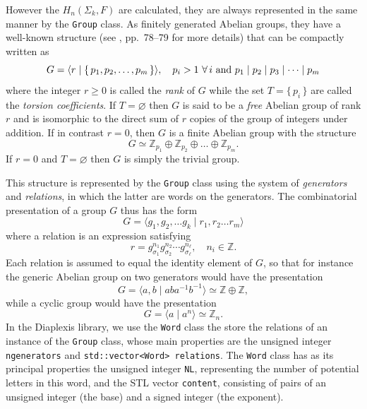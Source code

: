 \documentclass[12pt,letterpaper]{report}
\begin{document}
However the $H_n(\Sigma_k,F)$ are calculated, they are always represented in the same manner by  
the \texttt{Group} class. As finitely generated Abelian groups, they have a well-known structure (see 
\cite{Hungerford}, pp.\ 78--79 for more details) that can be compactly written as 
\begin{equation}
G = \langle r \mid \{\, p_1,p_2,\dots,p_m \,\} \rangle, \quad p_i > 1 \,\, \forall \, i \textnormal{ and } 
p_1\mid p_2 \mid p_3 \mid \dotsb \mid p_m
\end{equation}
where the integer $r \ge 0$ is called the \emph{rank} of $G$ while the set $T = \{\, p_i \,\}$ are called the 
\emph{torsion coefficients}. If $T=\varnothing$ then $G$ is said to be a \emph{free} Abelian group 
of rank $r$ and is isomorphic to the direct sum of $r$ copies of the group of integers under addition. 
If in contrast $r=0$, then $G$ is a finite Abelian group with the structure 
\begin{equation*}
G \simeq \mathbb{Z}_{p_1} \oplus \mathbb{Z}_{p_2} \oplus \dots \oplus \mathbb{Z}_{p_m}. 
\end{equation*}
If $r = 0$ and $T = \varnothing$ then $G$ is simply the trivial group. 

This structure is represented by the \texttt{Group} class using the system of \emph{generators} and 
\emph{relations}, in which the latter are words on the generators. The combinatorial presentation 
of a group $G$ thus has the form
\begin{equation}
G = \langle g_1,g_2,\dots g_k \mid r_1,r_2\dots r_m \rangle
\end{equation} 
where a relation is an expression satisfying
\begin{equation}
r = g_{\sigma_1}^{n_1} g_{\sigma_2}^{n_2} \dotsb g_{\sigma_\ell}^{n_\ell}, \quad n_i \in \mathbb{Z}.
\end{equation}
Each relation is assumed to equal the identity element of $G$, so that for instance the generic Abelian group on 
two generators would have the presentation 
\begin{equation*}
G = \langle a,b \mid aba^{-1}b^{-1} \rangle \simeq \mathbb{Z} \oplus \mathbb{Z},
\end{equation*}
while a cyclic group would have the presentation
\begin{equation*}
G = \langle a \mid a^n \rangle \simeq \mathbb{Z}_n. 
\end{equation*} 
In the Diaplexis library, we use the \texttt{Word} class the store the relations of an instance of the \texttt{Group} 
class, whose main properties are the unsigned integer \texttt{ngenerators} and \texttt{std::vector<Word> relations}. 
The \texttt{Word} class has as its principal properties the unsigned integer \texttt{NL}, representing the 
number of potential letters in this word, and the STL vector \texttt{content}, consisting of pairs of an 
unsigned integer (the base) and a signed integer (the exponent).
\end{document}
